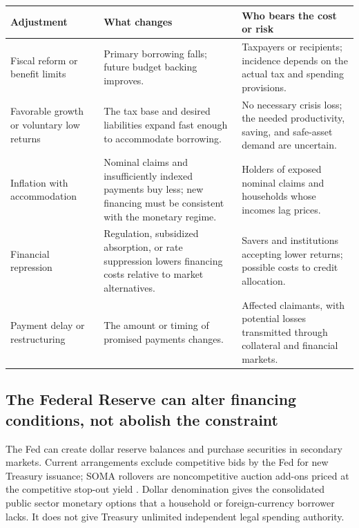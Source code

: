 \documentclass[11pt]{article}
\begin{document}
\begin{center}
\small
\renewcommand{\arraystretch}{1.13}
\begin{tabularx}{\textwidth}{p{}YY}
\toprule
Adjustment & What changes & Who bears the cost or risk\\
\midrule
Fiscal reform or benefit limits & Primary borrowing falls; future budget backing improves. &
Taxpayers or recipients; incidence depends on the actual tax and spending provisions.\\
\addlinespace
Favorable growth or voluntary low returns & The tax base and desired liabilities expand
fast enough to accommodate borrowing. & No necessary crisis loss; the needed productivity,
saving, and safe-asset demand are uncertain.\\
\addlinespace
Inflation with accommodation & Nominal claims and insufficiently indexed payments buy
less; new financing must be consistent with the monetary regime. & Holders of exposed
nominal claims and households whose incomes lag prices.\\
\addlinespace
Financial repression & Regulation, subsidized absorption, or rate suppression lowers
financing costs relative to market alternatives. & Savers and institutions accepting
lower returns; possible costs to credit allocation.\\
\addlinespace
Payment delay or restructuring & The amount or timing of promised payments changes. &
Affected claimants, with potential losses transmitted through collateral and financial markets.\\
\bottomrule
\end{tabularx}
\end{center}

\subsection*{The Federal Reserve can alter financing conditions, not abolish the constraint}

The Fed can create dollar reserve balances and purchase securities in secondary markets.
Current arrangements exclude competitive bids by the Fed for new Treasury issuance;
SOMA rollovers are noncompetitive auction add-ons priced at the competitive stop-out yield
\cite{fedTreasuryPurchases,nyFedRollovers}. Dollar denomination gives the consolidated
public sector monetary options that a household or foreign-currency borrower lacks.
It does not give Treasury unlimited independent legal spending authority.
\end{document}
